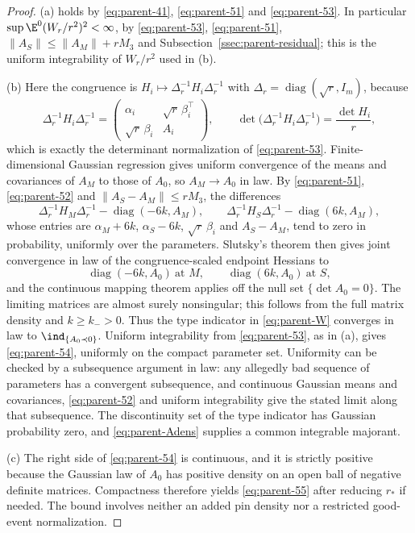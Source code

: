 \begin{proof}
(a) holds by \eqref{eq:parent-41}, \eqref{eq:parent-51} and \eqref{eq:parent-53}. In particular $\sup\E^0(W_r/r^2)^2<\infty$, by \eqref{eq:parent-53}, \eqref{eq:parent-51}, $\|A_S\|\le\|A_M\|+rM_3$ and Subsection~\ref{ssec:parent-residual}; this is the uniform integrability of $W_r/r^2$ used in (b).

(b) Here the congruence is $H_i\mapsto\Delta_r^{-1}H_i\Delta_r^{-1}$ with $\Delta_r=\operatorname{diag}(\sqrt r,I_m)$, because
\begin{equation}\label{eq:parent-congr}
\Delta_r^{-1}H_i\Delta_r^{-1}=\begin{pmatrix}\alpha_i&\sqrt r\,\beta_i^{\top}\\ \sqrt r\,\beta_i&A_i\end{pmatrix},\qquad \det\bigl(\Delta_r^{-1}H_i\Delta_r^{-1}\bigr)=\frac{\det H_i}r,
\end{equation}
which is exactly the determinant normalization of \eqref{eq:parent-53}. Finite-dimensional Gaussian regression gives uniform convergence of the means and covariances of $A_M$ to those of $A_0$, so $A_M\to A_0$ in law. By \eqref{eq:parent-51}, \eqref{eq:parent-52} and $\|A_S-A_M\|\le rM_3$, the differences
\[
\Delta_r^{-1}H_M\Delta_r^{-1}-\operatorname{diag}(-6k,A_M),\qquad \Delta_r^{-1}H_S\Delta_r^{-1}-\operatorname{diag}(6k,A_M),
\]
whose entries are $\alpha_M+6k$, $\alpha_S-6k$, $\sqrt r\,\beta_i$ and $A_S-A_M$, tend to zero in probability, uniformly over the parameters. Slutsky's theorem then gives joint convergence in law of the congruence-scaled endpoint Hessians to
\[
\operatorname{diag}(-6k,A_0)\ \text{at }M,\qquad \operatorname{diag}(6k,A_0)\ \text{at }S ,
\]
and the continuous mapping theorem applies off the null set $\{\det A_0=0\}$. The limiting matrices are almost surely nonsingular; this follows from the full matrix density and $k\ge k_->0$. Thus the type indicator in \eqref{eq:parent-W} converges in law to $\ind_{\{A_0\prec0\}}$. Uniform integrability from \eqref{eq:parent-53}, as in (a), gives \eqref{eq:parent-54}, uniformly on the compact parameter set. Uniformity can be checked by a subsequence argument in law: any allegedly bad sequence of parameters has a convergent subsequence, and continuous Gaussian means and covariances, \eqref{eq:parent-52} and uniform integrability give the stated limit along that subsequence. The discontinuity set of the type indicator has Gaussian probability zero, and \eqref{eq:parent-Adens} supplies a common integrable majorant.

(c) The right side of \eqref{eq:parent-54} is continuous, and it is strictly positive because the Gaussian law of $A_0$ has positive density on an open ball of negative definite matrices. Compactness therefore yields \eqref{eq:parent-55} after reducing $r_*$ if needed. The bound involves neither an added pin density nor a restricted good-event normalization.
\end{proof}

